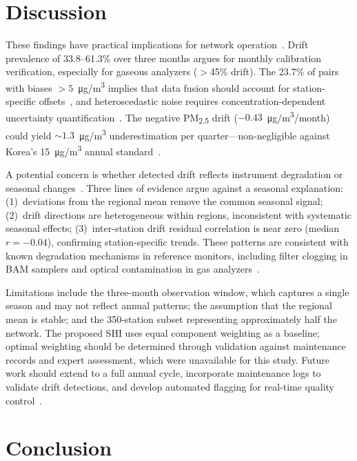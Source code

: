 \documentclass[12pt]{article}
\begin{document}
\section{Discussion}

These findings have practical implications for network operation~\cite{epa2017qapp, duyzer2015representativeness}. Drift prevalence of 33.8--61.3\% over three months argues for monthly calibration verification, especially for gaseous analyzers ($>$45\% drift). The 23.7\% of pairs with biases ${>}5$~\si{\micro\gram/\meter\cubed} implies that data fusion should account for station-specific offsets~\cite{jiao2016cairsense}, and heteroscedastic noise requires concentration-dependent uncertainty quantification~\cite{schneider2017dqa}. The negative PM\textsubscript{2.5} drift ($-0.43$~\si{\micro\gram/\meter\cubed}/month) could yield ${\sim}1.3$~\si{\micro\gram/\meter\cubed} underestimation per quarter---non-negligible against Korea's 15~\si{\micro\gram/\meter\cubed} annual standard~\cite{kme2018standard}.

A potential concern is whether detected drift reflects instrument degradation or seasonal changes~\cite{miskell2018drift}. Three lines of evidence argue against a seasonal explanation: (1)~deviations from the regional mean remove the common seasonal signal; (2)~drift directions are heterogeneous within regions, inconsistent with systematic seasonal effects; (3)~inter-station drift residual correlation is near zero (median $r = -0.04$), confirming station-specific trends. These patterns are consistent with known degradation mechanisms in reference monitors, including filter clogging in BAM samplers and optical contamination in gas analyzers~\cite{shukla2022bam, heal2012particles}.

Limitations include the three-month observation window, which captures a single season and may not reflect annual patterns; the assumption that the regional mean is stable; and the 350-station subset representing approximately half the network. The proposed SHI uses equal component weighting as a baseline; optimal weighting should be determined through validation against maintenance records and expert assessment, which were unavailable for this study. Future work should extend to a full annual cycle, incorporate maintenance logs to validate drift detections, and develop automated flagging for real-time quality control~\cite{bai2020china, spinelle2017eufield}.

\section{Conclusion}
\end{document}
